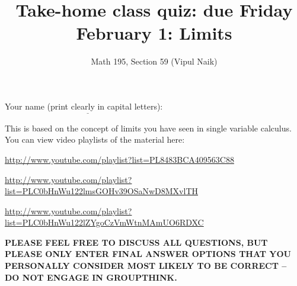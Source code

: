 \documentclass[10pt]{amsart}
\title{Take-home class quiz: due Friday February 1: Limits}
\author{Math 195, Section 59 (Vipul Naik)}
\begin{document}
\maketitle

Your name (print clearly in capital letters): $\underline{\qquad\qquad\qquad\qquad\qquad\qquad\qquad\qquad\qquad\qquad}$

This is based on the concept of limits you have seen in single
variable calculus. You can view video playlists of the material here:

\url{http://www.youtube.com/playlist?list=PL8483BCA409563C88}

\url{http://www.youtube.com/playlist?list=PLC0bHnWu122lmsGOHv39OSaNwD8MXvlTH}

\url{http://www.youtube.com/playlist?list=PLC0bHnWu122lZYgoCzVmWtnMAmUO6RDXC}

{\bf PLEASE FEEL FREE TO DISCUSS ALL QUESTIONS, BUT PLEASE ONLY ENTER
FINAL ANSWER OPTIONS THAT YOU PERSONALLY CONSIDER MOST LIKELY TO BE
CORRECT -- DO NOT ENGAGE IN GROUPTHINK.}
\end{document}
